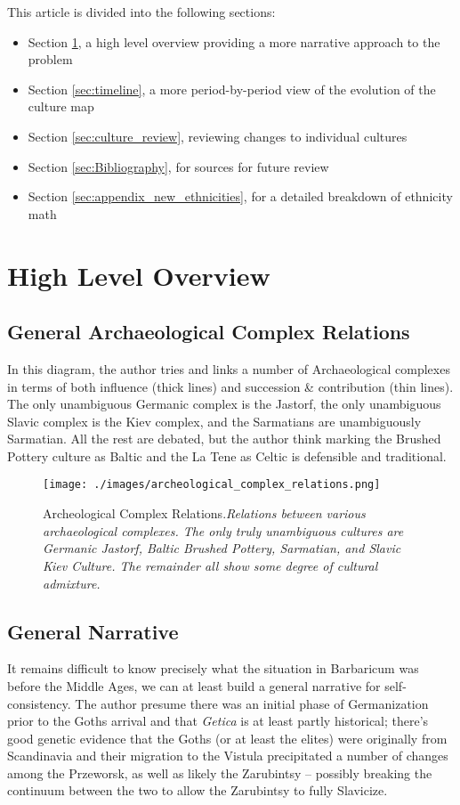 \documentclass{article}
\begin{document}
	This article is divided into the following sections:
	
	\begin{itemize}
		\item Section \ref{sec:high_level_overview}, a high level overview providing a more narrative approach to the problem
		\item Section \ref{sec:timeline}, a more period-by-period view of the evolution of the culture map
		\item Section \ref{sec:culture_review}, reviewing changes to individual cultures
		\item Section \ref{sec:Bibliography}, for sources for future review
		\item Section \ref{sec:appendix_new_ethnicities}, for a detailed breakdown of ethnicity math
	\end{itemize}
	
	\section{High Level Overview}
	\label{sec:high_level_overview}
	
	\subsection{General Archaeological Complex Relations}
	In this diagram, the author tries and links a number of Archaeological complexes in terms of both influence (thick lines) and succession \& contribution (thin lines).
	The only unambiguous Germanic complex is the Jastorf,  the only unambiguous Slavic complex is the Kiev complex, and the Sarmatians are unambiguously Sarmatian.
	All the rest are debated, but the author think marking the Brushed Pottery culture as Baltic and the La Tene as Celtic is defensible and traditional.
	
	\begin{figure}[h]
		\centering
		\texttt{[image: ./images/archeological\_complex\_relations.png]}
		\caption{Archeological Complex Relations.\newline \small \textit{Relations between various archaeological complexes.
				The only truly unambiguous cultures are Germanic Jastorf, Baltic Brushed Pottery, Sarmatian, and Slavic Kiev Culture.
				The remainder all show some degree of cultural admixture.}}
	\end{figure}
	
	\subsection{General Narrative}
	It remains difficult to know precisely what the situation in Barbaricum was before the Middle Ages, we can at least build a general narrative for self-consistency.
	The author presume there was an initial phase of Germanization prior to the Goths arrival and that \textit{Getica} is at least partly historical; there’s good genetic evidence that the Goths (or at least the elites) were originally from Scandinavia and their migration to the Vistula precipitated a number of changes among the Przeworsk, as well as likely the Zarubintsy – possibly breaking the continuum between the two to allow the Zarubintsy to fully Slavicize.
	
\end{document}
